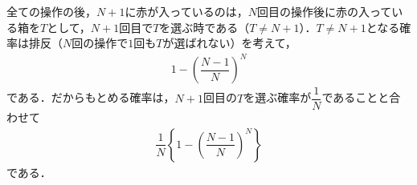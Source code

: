 \documentclass[../../main.tex]{subfiles}
\begin{document}
全ての操作の後，$N+1$に赤が入っているのは，$N$回目の操作後に赤の入っている箱を$T$として，$N+1$回目で$T$を選ぶ時である（$T\ne N+1$）．$T\ne N+1$となる確率は排反（$N$回の操作で$1$回も$T$が選ばれない）を考えて，
\begin{align}
  1-\left(\dfrac{N-1}{N}\right)^N
\end{align}
である．だからもとめる確率は，$N+1$回目の$T$を選ぶ確率が$\dfrac{1}{N}$であることと合わせて
\begin{align}
  \dfrac{1}{N}\left\{1-\left(\dfrac{N-1}{N}\right)^N\right\}
\end{align}
である．

\newpage
\end{document}
